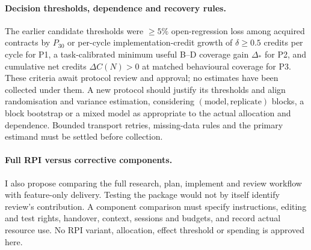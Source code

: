 \paragraph{Decision thresholds, dependence and recovery rules.}
The earlier candidate thresholds were $\geq5\%$ open-regression loss among
acquired contracts by $P_{30}$ or per-cycle implementation-credit growth
of $\delta\geq0.5$ credits per cycle for P1, a task-calibrated minimum
useful B--D coverage gain $\Delta_*$ for P2, and cumulative net credits
$\Delta C(N)>0$ at matched behavioural coverage for P3.
These criteria await protocol review and approval; no estimates have been
collected under them.
A new protocol should justify its thresholds and align randomisation and
variance estimation, considering $(\mathrm{model},\mathrm{replicate})$
blocks, a block bootstrap or a mixed model as appropriate to the actual
allocation and dependence. Bounded transport retries, missing-data rules
and the primary estimand must be settled before collection.

\paragraph{Full RPI versus corrective components.}
I also propose comparing the full research, plan, implement and review
workflow with feature-only delivery.
Testing the package would not by itself identify review's contribution.
A component comparison must specify instructions, editing and test rights,
handover, context, sessions and budgets, and record actual resource use.
No RPI variant, allocation, effect threshold or spending is approved here.

